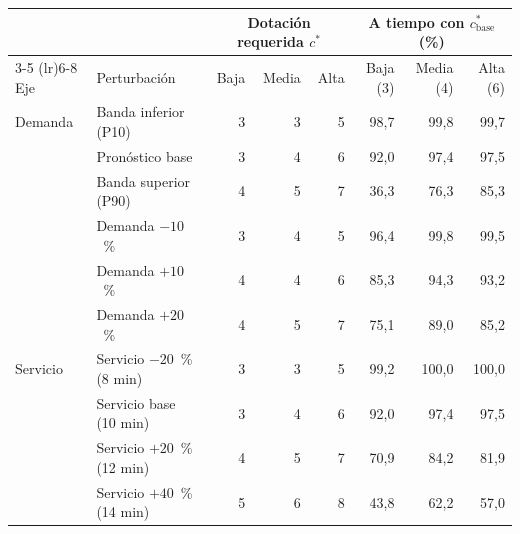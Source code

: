 {\small\setlength{\tabcolsep}{4.5pt}
\begin{tabular}{llrrrrrr}
\toprule
 & & \multicolumn{3}{c}{Dotación requerida $c^*$} & \multicolumn{3}{c}{A tiempo con $c^*_{\mathrm{base}}$ (\%)} \\
\cmidrule(lr){3-5} \cmidrule(lr){6-8}
Eje & Perturbación & Baja & Media & Alta & Baja (3) & Media (4) & Alta (6) \\
\midrule
Demanda & Banda inferior (P10) & 3 & 3 & 5 & 98,7 & 99,8 & 99,7 \\
 & Pronóstico base & 3 & 4 & 6 & 92,0 & 97,4 & 97,5 \\
 & Banda superior (P90) & 4 & 5 & 7 & 36,3 & 76,3 & 85,3 \\
 & Demanda $-10$~\% & 3 & 4 & 5 & 96,4 & 99,8 & 99,5 \\
 & Demanda $+10$~\% & 4 & 4 & 6 & 85,3 & 94,3 & 93,2 \\
 & Demanda $+20$~\% & 4 & 5 & 7 & 75,1 & 89,0 & 85,2 \\
\midrule
Servicio & Servicio $-20$~\% (8 min) & 3 & 3 & 5 & 99,2 & 100,0 & 100,0 \\
 & Servicio base (10 min) & 3 & 4 & 6 & 92,0 & 97,4 & 97,5 \\
 & Servicio $+20$~\% (12 min) & 4 & 5 & 7 & 70,9 & 84,2 & 81,9 \\
 & Servicio $+40$~\% (14 min) & 5 & 6 & 8 & 43,8 & 62,2 & 57,0 \\
\bottomrule
\end{tabular}}
